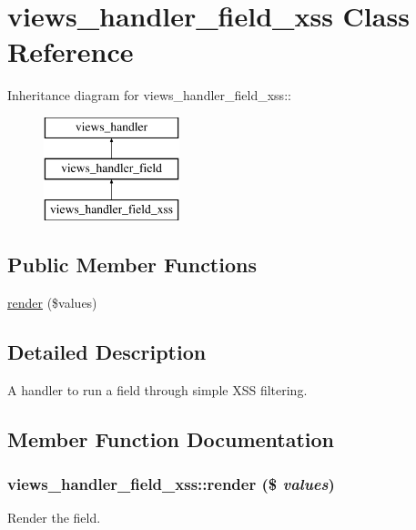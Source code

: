 \hypertarget{classviews__handler__field__xss}{
\section{views\_\-handler\_\-field\_\-xss Class Reference}
\label{classviews__handler__field__xss}
}
Inheritance diagram for views\_\-handler\_\-field\_\-xss::\begin{figure}[H]
\begin{center}
\leavevmode
\includegraphics[height=3cm]{classviews__handler__field__xss}
\end{center}
\end{figure}
\subsection*{Public Member Functions}
\begin{DoxyCompactItemize}
\item 
\hyperlink{classviews__handler__field__xss_afbfbc9ee1d2927e22cd5385c5f2fa918}{render} (\$values)
\end{DoxyCompactItemize}


\subsection{Detailed Description}
A handler to run a field through simple XSS filtering. 

\subsection{Member Function Documentation}
\hypertarget{classviews__handler__field__xss_afbfbc9ee1d2927e22cd5385c5f2fa918}{
\subsubsection[{render}]{\setlength{\rightskip}{0pt plus 5cm}views\_\-handler\_\-field\_\-xss::render (\$ {\em values})}}
\label{classviews__handler__field__xss_afbfbc9ee1d2927e22cd5385c5f2fa918}
Render the field.


